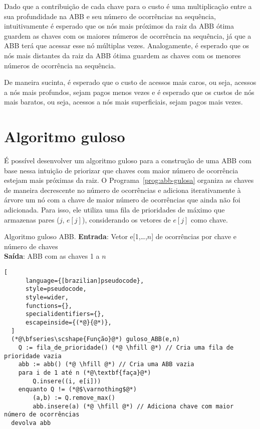 Dado que a contribuição de cada chave para o custo é uma multiplicação entre a sua profundidade na ABB e seu número de ocorrências na sequência, intuitivamente é esperado que os nós mais próximos da raiz da ABB ótima guardem as chaves com os maiores números de ocorrência na sequência, já que a ABB terá que acessar esse nó múltiplas vezes. Analogamente, é esperado que os nós mais distantes da raiz da ABB ótima guardem as chaves com os menores números de ocorrência na sequência.

De maneira sucinta, é esperado que o custo de acessos mais caros, ou seja, acessos a nós mais profundos, sejam pagos menos vezes e é esperado que os custos de nós mais baratos, ou seja, acessos a nós mais superficiais, sejam pagos mais vezes.

\section{Algoritmo guloso}

É possível desenvolver um algoritmo guloso para a construção de uma ABB com base nessa intuição de priorizar que chaves com maior número de ocorrência estejam mais próximas da raiz. O Programa~\ref{prog:abb-gulosa} organiza as chaves de maneira decrescente no número de ocorrências e adiciona iterativamente à árvore um nó com a chave de maior número de ocorrências que ainda não foi adicionada. Para isso, ele utiliza uma fila de prioridades de máximo que armazenas pares ($j$, $e[j]$), considerando os vetores de $e[j]$ como chave.



\begin{programruledcaption}{Algoritmo guloso ABB.\label{prog:abb-gulosa}}
  \noindent\textbf{Entrada}: Vetor e[1,\ldots,$n$] de ocorrências por chave e número de chaves \\
  \textbf{Saída}: ABB com as chaves 1 a $n$
  \vspace{-0.5\baselineskip}
  \begin{lstlisting}[
      language={[brazilian]pseudocode},
      style=pseudocode,
      style=wider,
      functions={},
      specialidentifiers={},
      escapeinside={(*@}{@*)},
  ]
  (*@\bfseries\scshape{Função}@*) guloso_ABB(e,n)
    Q := fila_de_prioridade() (*@ \hfill @*) // Cria uma fila de prioridade vazia
    abb := abb() (*@ \hfill @*) // Cria uma ABB vazia
    para i de 1 até n (*@\textbf{faça}@*)
        Q.insere((i, e[i])) 
    enquanto Q != (*@$\varnothing$@*) 
        (a,b) := Q.remove_max()
        abb.insere(a) (*@ \hfill @*) // Adiciona chave com maior número de ocorrências
  devolva abb
  \end{lstlisting}
  \vspace{-0.5\baselineskip}
\end{programruledcaption}

